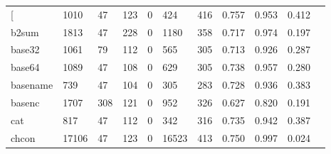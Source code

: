 \begin{longtable}{lp{1.10cm}p{1.10cm}p{1.10cm}p{1.10cm}p{1.10cm}p{1.10cm}p{1.10cm}p{1.10cm}p{1.10cm}p{1.10cm}}
\bottomrule
\endlastfoot
{[}         &                   1010 &                                 47 &                               123 &                                0 &                               424 &                             416 &                          0.757 &                                 0.953 &                               0.412 \\
b2sum     &                   1813 &                                 47 &                               228 &                                0 &                              1180 &                             358 &                          0.717 &                                 0.974 &                               0.197 \\
base32    &                   1061 &                                 79 &                               112 &                                0 &                               565 &                             305 &                          0.713 &                                 0.926 &                               0.287 \\
base64    &                   1089 &                                 47 &                               108 &                                0 &                               629 &                             305 &                          0.738 &                                 0.957 &                               0.280 \\
basename  &                    739 &                                 47 &                               104 &                                0 &                               305 &                             283 &                          0.728 &                                 0.936 &                               0.383 \\
basenc    &                   1707 &                                308 &                               121 &                                0 &                               952 &                             326 &                          0.627 &                                 0.820 &                               0.191 \\
cat       &                    817 &                                 47 &                               112 &                                0 &                               342 &                             316 &                          0.735 &                                 0.942 &                               0.387 \\
chcon     &                  17106 &                                 47 &                               123 &                                0 &                             16523 &                             413 &                          0.750 &                                 0.997 &                               0.024 \\

\end{longtable}
